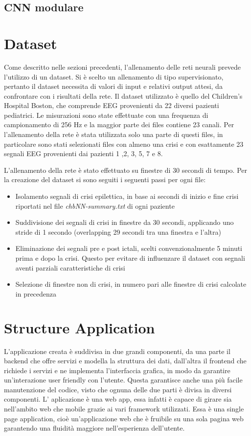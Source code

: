 \documentclass{article}
\begin{document}
\subsection{CNN modulare}


\section{Dataset}
Come descritto nelle sezioni precedenti, l'allenamento delle reti neurali prevede l'utilizzo di un dataset. Si è scelto un allenamento di tipo supervisionato, pertanto il dataset necessita di valori di input e relativi output attesi, da confrontare con i risultati della rete. Il dataset utilizzato è quello del Children's Hospital Boston, che comprende EEG provenienti da 22 diversi pazienti pediatrici. Le misurazioni sono state effettuate con una frequenza di campionamento di 256 Hz e la maggior parte dei files contiene 23 canali. Per l'allenamento della rete è stata utilizzata solo una parte di questi files, in particolare sono stati selezionati files con almeno una crisi e con esattamente 23 segnali EEG provenienti dai pazienti 1 ,2, 3, 5, 7 e 8.

L'allenamento della rete è stato effettuato su finestre di 30 secondi di tempo. Per la creazione del dataset si sono seguiti i seguenti passi per ogni file:
\begin{itemize}
\item Isolamento segnali di crisi epilettica, in base ai secondi di inizio e fine crisi riportati nel file \textit{chbNN-summary.txt} di ogni paziente
\item Suddivisione dei segnali di crisi in finestre da 30 secondi, applicando uno stride di 1 secondo (overlapping 29 secondi tra una finestra e l'altra)
\item Eliminazione dei segnali pre e post ictali, scelti convenzionalmente 5 minuti prima e dopo la crisi. Questo per evitare di influenzare il dataset con segnali aventi parziali caratteristiche di crisi
\item Selezione di finestre non di crisi, in numero pari alle finestre di crisi calcolate in precedenza
\end{itemize}
\section{Structure Application}
L'applicazione creata è suddivisa in due grandi componenti, da una parte il backend che offre servizi e modella la struttura dei dati, dall'altra il frontend che richiede i servizi e ne implementa l'interfaccia grafica, in modo da garantire un'interazione user friendly con l'utente.
Questa garantisce anche una più facile manutenzione del codice, visto che ognuna delle due parti è divisa in diversi componenti.
L' aplicazione è una web app, essa infatti è capace di girare sia nell'ambito web che mobile grazie ai vari framework utilizzati.
Essa è una single page application, cioè un'applicazione web che è fruibile su una sola pagina web garantendo una fluidità maggiore nell'esperienza dell'utente.
\end{document}
